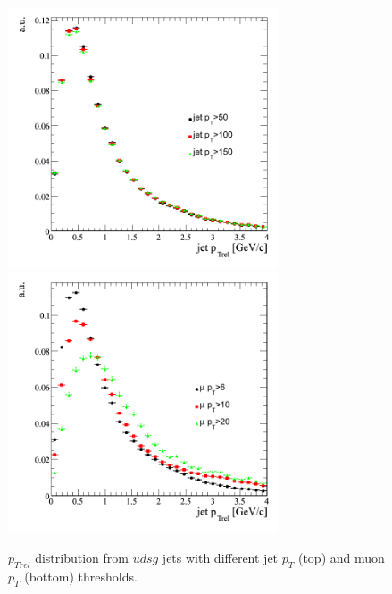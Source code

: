 \begin{figure}[htbp]
  \begin{center}
    \includegraphics[width=80mm]{Figures/jet_ptreludsg_jetcuts.png}
    \includegraphics[width=80mm]{Figures/jet_ptreludsg_mucuts.png}
  \end{center}
  \caption{$p_{Trel}$ distribution from $udsg$ jets with different jet $p_T$ (top) and muon $p_T$ (bottom) thresholds.}
  \label{fig:jet_ptrel_udsg_cuts}
\end{figure}

